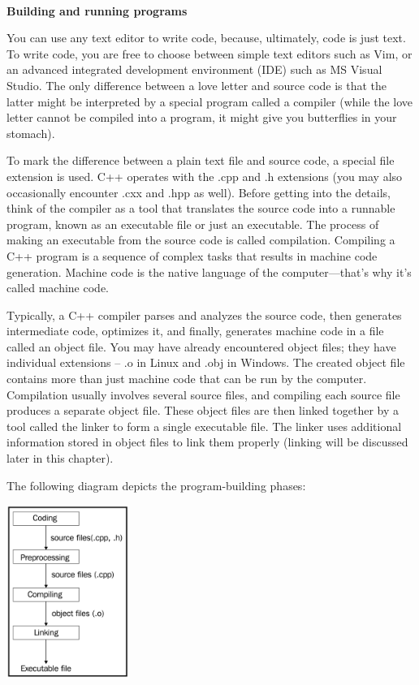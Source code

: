 \noindent\textbf{}\ \par
\textbf{Building and running programs}\ \par
You can use any text editor to write code, because, ultimately, code is just text. To write code, you are free to choose between simple text editors such as Vim, or an advanced integrated development environment (IDE) such as MS Visual Studio. The only difference between a love letter and source code is that the latter might be interpreted by a special program called a compiler (while the love letter cannot be compiled into a program, it might give you butterflies in your stomach). \par
To mark the difference between a plain text file and source code, a special file extension is used. C++ operates with the  .cpp and  .h extensions (you may also occasionally encounter .cxx and  .hpp as well). Before getting into the details, think of the compiler as a tool that translates the source code into a runnable program, known as an executable file or just an executable. The process of making an executable from the source code is called compilation. Compiling a C++ program is a sequence of complex tasks that results in machine code generation. Machine code is the native language of the computer—that's why it's called machine code. \par
Typically, a C++ compiler parses and analyzes the source code, then generates intermediate code, optimizes it, and finally, generates machine code in a file called an object file. You may have already encountered object files; they have individual extensions –  .o in Linux and  .obj in Windows. The created object file contains more than just machine code that can be run by the computer. Compilation usually involves several source files, and compiling each source file produces a separate object file. These object files are then linked together by a tool called the linker to form a single executable file. The linker uses additional information stored in object files to link them properly (linking will be discussed later in this chapter). \par
The following diagram depicts the program-building phases: \par

\begin{center}
	\includegraphics[width=0.3\textwidth]{content/Section-1/Chapter-1/1}
\end{center}


